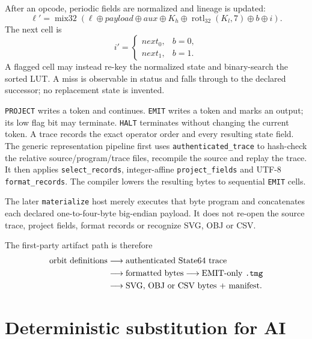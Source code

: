 \documentclass[11pt,a4paper]{article}
\newcommand{\code}[1]{\texttt{#1}}
\begin{document}
After an opcode, periodic fields are normalized and lineage is updated:
\begin{equation}
\ell'=\operatorname{mix32}(\ell\oplus payload\oplus aux\oplus K_h\oplus\operatorname{rotl}_{32}(K_l,7)\oplus b\oplus i).
\end{equation}
The next cell is
\begin{equation}
i'=\begin{cases}next_0,&b=0,\\next_1,&b=1.\end{cases}
\end{equation}
A flagged cell may instead re-key the normalized state and binary-search the sorted LUT. A miss is observable in status and falls through to the declared successor; no replacement state is invented.

\code{PROJECT} writes a token and continues. \code{EMIT} writes a token and marks an output; its low flag bit may terminate. \code{HALT} terminates without changing the current token. A trace records the exact operator order and every resulting state field. The generic representation pipeline first uses \code{authenticated\_trace} to hash-check the relative source/program/trace files, recompile the source and replay the trace. It then applies \code{select\_records}, integer-affine \code{project\_fields} and UTF-8 \code{format\_records}. The compiler lowers the resulting bytes to sequential \code{EMIT} cells.

The later \code{materialize} host merely executes that byte program and concatenates each declared one-to-four-byte big-endian payload. It does not re-open the source trace, project fields, format records or recognize SVG, OBJ or CSV.

The first-party artifact path is therefore
\begin{equation}
\begin{aligned}
\text{orbit definitions}&\longrightarrow\text{authenticated State64 trace}\\
&\longrightarrow\text{formatted bytes}\longrightarrow\text{EMIT-only \texttt{.tmg}}\\
&\longrightarrow\text{SVG, OBJ or CSV bytes + manifest}.
\end{aligned}
\end{equation}

\section{Deterministic substitution for AI}
\end{document}
